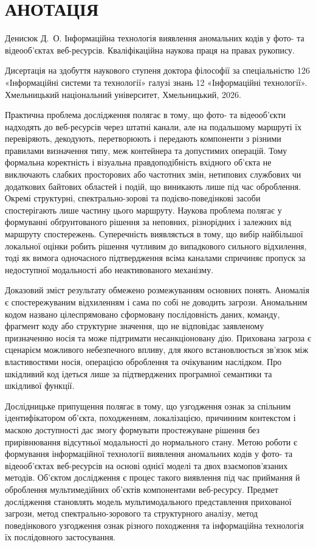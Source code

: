 \chapter*{АНОТАЦІЯ}

Денисюк Д.~О. Інформаційна технологія виявлення аномальних кодів у фото- та відеооб’єктах веб-ресурсів. Кваліфікаційна наукова праця на правах рукопису.

Дисертація на здобуття наукового ступеня доктора філософії за спеціальністю 126 «Інформаційні системи та технології» галузі знань 12 «Інформаційні технології». Хмельницький національний університет, Хмельницький, 2026.

Практична проблема дослідження полягає в тому, що фото- та відеооб’єкти надходять до веб-ресурсів через штатні канали, але на подальшому маршруті їх перевіряють, декодують, перетворюють і передають компоненти з різними правилами визначення типу, меж контейнера та допустимих операцій. Тому формальна коректність і візуальна правдоподібність вхідного об’єкта не виключають слабких просторових або частотних змін, нетипових службових чи додаткових байтових областей і подій, що виникають лише під час оброблення. Окремі структурні, спектрально-зорові та подієво-поведінкові засоби спостерігають лише частину цього маршруту. Наукова проблема полягає у формуванні обґрунтованого рішення за неповних, різнорідних і залежних від маршруту спостережень. Суперечність виявляється в тому, що вибір найбільшої локальної оцінки робить рішення чутливим до випадкового сильного відхилення, тоді як вимога одночасного підтвердження всіма каналами спричиняє пропуск за недоступної модальності або неактивованого механізму.

Доказовий зміст результату обмежено розмежуванням основних понять. Аномалія є спостережуваним відхиленням і сама по собі не доводить загрози. Аномальним кодом названо цілеспрямовано сформовану послідовність даних, команду, фрагмент коду або структурне значення, що не відповідає заявленому призначенню носія та може підтримати несанкціоновану дію. Прихована загроза є сценарієм можливого небезпечного впливу, для якого встановлюється зв’язок між властивостями носія, операцією оброблення та очікуваним наслідком. Про шкідливий код ідеться лише за підтверджених програмної семантики та шкідливої функції.

Дослідницьке припущення полягає в тому, що узгодження ознак за спільним ідентифікатором об’єкта, походженням, локалізацією, причинним контекстом і маскою доступності дає змогу формувати простежуване рішення без прирівнювання відсутньої модальності до нормального стану. Метою роботи є формування інформаційної технології виявлення аномальних кодів у фото- та відеооб’єктах веб-ресурсів на основі однієї моделі та двох взаємопов’язаних методів. Об’єктом дослідження є процес такого виявлення під час приймання й оброблення мультимедійних об’єктів компонентами веб-ресурсу. Предмет дослідження становлять модель мультимодального представлення прихованої загрози, метод спектрально-зорового та структурного аналізу, метод поведінкового узгодження ознак різного походження та інформаційна технологія їх послідовного застосування.

